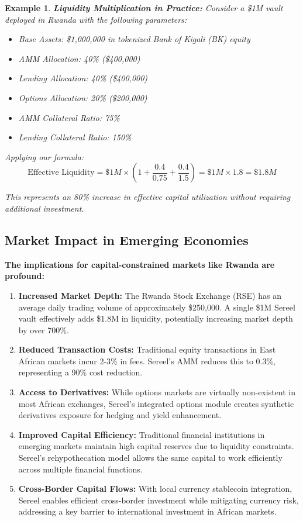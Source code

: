 \documentclass[12pt]{article}
\newtheorem{example}{Example}
\begin{document}
\begin{example}
\textbf{Liquidity Multiplication in Practice:} Consider a \$1M vault deployed in Rwanda with the following parameters:

\begin{itemize}
  \item Base Assets: \$1,000,000 in tokenized Bank of Kigali (BK) equity
  \item AMM Allocation: 40\% (\$400,000)
  \item Lending Allocation: 40\% (\$400,000)
  \item Options Allocation: 20\% (\$200,000)
  \item AMM Collateral Ratio: 75\%
  \item Lending Collateral Ratio: 150\%
\end{itemize}

Applying our formula:
$$\text{Effective Liquidity} = \$1M \times \left(1 + \frac{0.4}{0.75} + \frac{0.4}{1.5}\right) = \$1M \times 1.8 = \$1.8M$$

This represents an 80\% increase in effective capital utilization without requiring additional investment.
\end{example}

\subsection{Market Impact in Emerging Economies}
\textbf{The implications for capital-constrained markets like Rwanda are profound:}

\begin{enumerate}
  \item \textbf{Increased Market Depth:} The Rwanda Stock Exchange (RSE) has an average daily trading volume of approximately \$250,000. A single \$1M Sereel vault effectively adds \$1.8M in liquidity, potentially increasing market depth by over 700\%.
  
  \item \textbf{Reduced Transaction Costs:} Traditional equity transactions in East African markets incur 2-3\% in fees. Sereel's AMM reduces this to 0.3\%, representing a 90\% cost reduction.
  
  \item \textbf{Access to Derivatives:} While options markets are virtually non-existent in most African exchanges, Sereel's integrated options module creates synthetic derivatives exposure for hedging and yield enhancement.
  
  \item \textbf{Improved Capital Efficiency:} Traditional financial institutions in emerging markets maintain high capital reserves due to liquidity constraints. Sereel's rehypothecation model allows the same capital to work efficiently across multiple financial functions.
  
  \item \textbf{Cross-Border Capital Flows:} With local currency stablecoin integration, Sereel enables efficient cross-border investment while mitigating currency risk, addressing a key barrier to international investment in African markets.
\end{enumerate}
\end{document}
